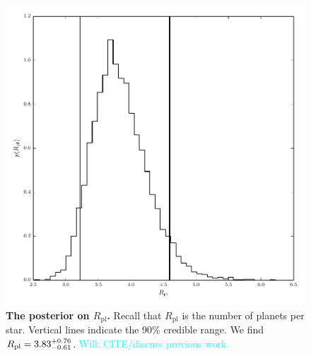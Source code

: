 \documentclass{nature}
\newcommand{\Rpl}{R_\mathrm{pl}}
\newcommand{\Will}[1]{\textcolor{cyan}{Will: #1}}
\begin{document}
\begin{figure}
  \includegraphics[width=\columnwidth]{npl}
  \caption{\label{fig:npl} \textbf{The posterior on $\Rpl$.}  Recall
    that $\Rpl$ is the number of planets per star.  Vertical lines
    indicate the 90\% credible range.  We find $\Rpl =
    \rplrange$. \Will{CITE/discuss previous work.}}
\end{figure}
\end{document}
